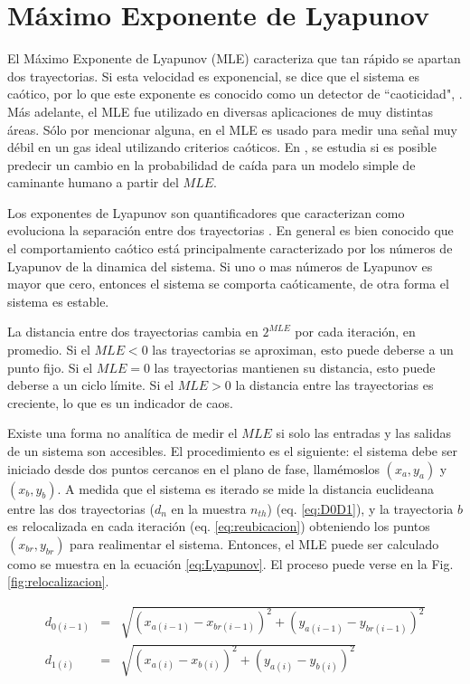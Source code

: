 \section{Máximo Exponente de Lyapunov}

El Máximo Exponente de Lyapunov (MLE) caracteriza que tan rápido se apartan dos trayectorias.
Si esta velocidad es exponencial, se dice que el sistema es caótico, por lo que este exponente es conocido como un detector de  ``caoticidad", \cite{strotgartz1994,Kantz1994,Sprott2003}.
Más adelante, el MLE fue utilizado en diversas aplicaciones de muy distintas áreas.
Sólo por mencionar alguna, en \cite{Ma2013} el MLE es usado para medir una señal muy débil en un gas ideal utilizando criterios caóticos.
En \cite{Bruijna2011}, se estudia si es posible predecir un cambio en la probabilidad de caída para un modelo simple de caminante humano a partir del $MLE$.

Los exponentes de Lyapunov son quantificadores que caracterizan como evoluciona la separación entre dos trayectorias \cite{Sprott2003}.
En general es bien conocido que el comportamiento caótico está principalmente caracterizado por los números de Lyapunov de la dinamica del sistema.
Si uno o mas números de Lyapunov es mayor que cero, entonces el sistema se comporta caóticamente, de otra forma el sistema es estable.

La distancia entre dos trayectorias cambia en $2^{MLE}$ por cada iteración, en promedio.
Si el $MLE<0$ las trayectorias se aproximan, esto puede deberse a un punto fijo.
Si el $MLE=0$ las trayectorias mantienen su distancia, esto puede deberse a un ciclo límite.
Si el $MLE>0$ la distancia entre las trayectorias es creciente, lo que es un indicador de caos.

Existe una forma no analítica de medir el $MLE$ si solo las entradas y las salidas de un sistema son accesibles.
El procedimiento es el siguiente: el sistema debe ser iniciado desde dos puntos cercanos en el plano de fase, llamémoslos $(x_a,y_a)$ y $(x_b,y_b)$.
A medida que el sistema es iterado se mide la distancia euclideana entre las dos trayectorias ($d_n$ en la muestra $n_{th}$) (eq. \ref{eq:D0D1}), y la trayectoria $b$ es relocalizada en cada iteración (eq. \ref{eq:reubicacion}) obteniendo los puntos $(x_{br},y_{br})$ para realimentar el sistema.
Entonces, el MLE puede ser calculado como se muestra en la ecuación \ref{eq:Lyapunov}.
El proceso puede verse en la Fig. \ref{fig:relocalizacion}.

\begin{eqnarray}\label{eq:D0D1}
d_{0(i-1)}&=& \sqrt{(x_{a(i-1)}-x_{br(i-1)})^2+(y_{a(i-1)}-y_{br(i-1)})^2}\nonumber\\
d_{1(i)}&=& \sqrt{(x_{a(i)}-x_{b(i)})^2+(y_{a(i)}-y_{b(i)})^2}\\
\nonumber
\end{eqnarray}

